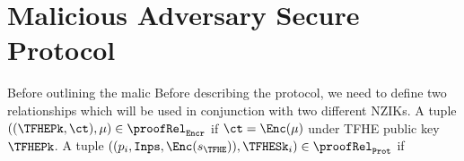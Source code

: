 \section{Malicious Adversary Secure Protocol}
\newcommand{\relEncr}{\proofRel_\texttt{Encr}}
\newcommand{\relProt}{\proofRel_\texttt{Prot}}
Before outlining the malic
\newcommand{\inCTList}{\texttt{Inps}}
\newcommand{\decryptShares}{\texttt{Shares}}
Before describing the protocol, we need to define two relationships which will be used in
conjunction with two different NZIKs. A tuple $((\TFHEPk, \ct), \mu) \in \relEncr$ if
$\ct = \Enc(\mu)$ under TFHE public key $\TFHEPk$.
A tuple $((p_i, \inCTList, \Enc(s_\TFHE)), \TFHESk_i) \in \relProt$ if

\centering
